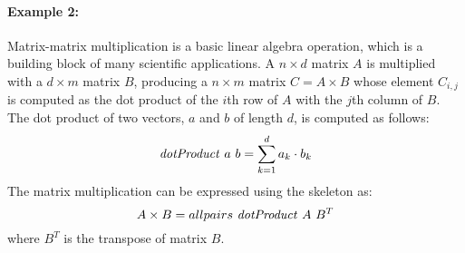 \paragraph{Example 2:}
Matrix-matrix multiplication is a basic linear algebra operation, which is a building block of many scientific applications.
A $n\times d$ matrix $A$ is multiplied with a $d\times m$ matrix $B$, producing a $n\times m$ matrix $C=A\times B$ whose element $C_{i,j}$ is computed as the dot product of the $i$th row of $A$ with the $j$th column of $B$.
The dot product of two vectors, $a$ and $b$ of length $d$, is computed as follows:
\begin{equation}
  \mbox{\emph{dotProduct}}\ a\ b = \sum_{k=1}^d a_k \cdot b_k
\end{equation}
The matrix multiplication can be expressed using the \allpairs skeleton as:
\begin{equation}
  A\times B = allpairs\ \mbox{\emph{dotProduct}}\ A\ B^T
  \label{eq:mat_mult_allpairs}
\end{equation}
where $B^T$ is the transpose of matrix $B$.

% 



